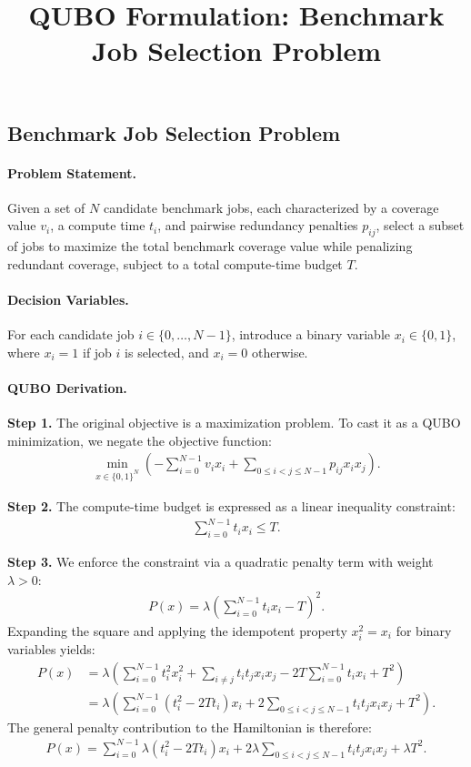 \documentclass[12pt]{article}
\title{QUBO Formulation: Benchmark Job Selection Problem}
\date{}
\begin{document}
\maketitle

\subsection*{Benchmark Job Selection Problem}

\paragraph{Problem Statement.}
Given a set of $N$ candidate benchmark jobs, each characterized by a coverage value $v_i$, a compute time $t_i$, and pairwise redundancy penalties $p_{ij}$, select a subset of jobs to maximize the total benchmark coverage value while penalizing redundant coverage, subject to a total compute-time budget $T$.

\paragraph{Decision Variables.}
For each candidate job $i \in \{0, \dots, N-1\}$, introduce a binary variable $x_i \in \{0,1\}$, where $x_i = 1$ if job $i$ is selected, and $x_i = 0$ otherwise.

\paragraph{QUBO Derivation.}
\textbf{Step 1.} The original objective is a maximization problem. To cast it as a QUBO minimization, we negate the objective function:
\begin{align}
    \min_{x \in \{0,1\}^N} \left( -\sum_{i=0}^{N-1} v_i x_i + \sum_{0 \leq i < j \leq N-1} p_{ij} x_i x_j \right).
\end{align}

\textbf{Step 2.} The compute-time budget is expressed as a linear inequality constraint:
\begin{align}
    \sum_{i=0}^{N-1} t_i x_i \leq T.
\end{align}

\textbf{Step 3.} We enforce the constraint via a quadratic penalty term with weight $\lambda > 0$:
\begin{align}
    P(x) = \lambda \left( \sum_{i=0}^{N-1} t_i x_i - T \right)^2.
\end{align}
Expanding the square and applying the idempotent property $x_i^2 = x_i$ for binary variables yields:
\begin{align}
    P(x) &= \lambda \left( \sum_{i=0}^{N-1} t_i^2 x_i^2 + \sum_{i \neq j} t_i t_j x_i x_j - 2T \sum_{i=0}^{N-1} t_i x_i + T^2 \right) \\
    &= \lambda \left( \sum_{i=0}^{N-1} (t_i^2 - 2T t_i) x_i + 2 \sum_{0 \leq i < j \leq N-1} t_i t_j x_i x_j + T^2 \right).
\end{align}
The general penalty contribution to the Hamiltonian is therefore:
\begin{align}
    P(x) = \sum_{i=0}^{N-1} \lambda (t_i^2 - 2T t_i) x_i + 2\lambda \sum_{0 \leq i < j \leq N-1} t_i t_j x_i x_j + \lambda T^2.
\end{align}
\end{document}
